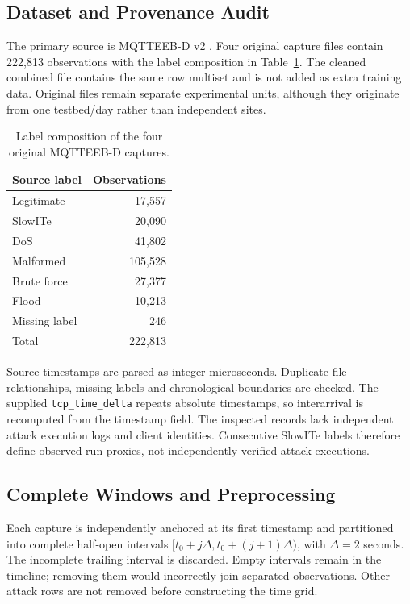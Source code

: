 \documentclass[conference]{IEEEtran}
\begin{document}
\subsection{Dataset and Provenance Audit}

The primary source is MQTTEEB-D v2 \cite{aqachtoul2025}. Four original
capture files contain 222,813 observations with the label composition
in Table~\ref{tab:data}. The cleaned combined file contains the same
row multiset and is not added as extra training data. Original files
remain separate experimental units, although they originate from one
testbed/day rather than independent sites.

\begin{table}[t]
\centering
\caption{Label composition of the four original MQTTEEB-D captures.}
\label{tab:data}
\begin{tabular}{lr}
\toprule
Source label & Observations \\
\midrule
Legitimate & 17,557 \\
SlowITe & 20,090 \\
DoS & 41,802 \\
Malformed & 105,528 \\
Brute force & 27,377 \\
Flood & 10,213 \\
Missing label & 246 \\
Total & 222,813 \\
\bottomrule
\end{tabular}
\end{table}

\begin{sloppypar}
Source timestamps are parsed as integer microseconds. Duplicate-\allowbreak file
relationships, missing labels and chronological boundaries are checked.
The supplied \texttt{tcp\_time\_delta} repeats absolute timestamps,
so interarrival is recomputed from the timestamp field. The inspected
records lack independent attack execution logs and client identities.
Consecutive SlowITe labels therefore define observed-run proxies,
not independently verified attack executions.
\end{sloppypar}

\subsection{Complete Windows and Preprocessing}

Each capture is independently anchored at its first timestamp and
partitioned into complete half-open intervals
$[t_0+j\Delta,t_0+(j+1)\Delta)$, with $\Delta=2$ seconds. The incomplete
trailing interval is discarded. Empty intervals remain in the timeline;
removing them would incorrectly join separated observations.
Other attack rows are not removed before constructing the time grid.
\end{document}
